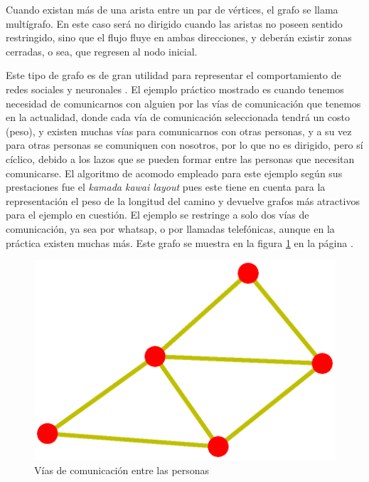 \documentclass{article}
\begin{document}
Cuando existan más de una arista entre un par de vértices, el grafo se llama multígrafo. En este caso será no dirigido cuando las aristas no poseen sentido restringido, sino que el flujo fluye en ambas direcciones, y deberán existir zonas cerradas, o sea, que regresen al nodo inicial.

Este tipo de grafo es de gran utilidad para representar el comportamiento de redes sociales y neuronales \cite{redes}. 
El ejemplo práctico mostrado es cuando tenemos necesidad de comunicarnos con alguien por las vías de comunicación que tenemos en la actualidad, donde cada vía de comunicación seleccionada tendrá un costo (peso), y existen muchas vías para comunicarnos con otras personas, y a su vez para otras personas se comuniquen con nosotros, por lo que no es dirigido, pero sí cíclico, debido a los lazos que se pueden formar entre las personas que necesitan comunicarse. El algoritmo de acomodo empleado para este ejemplo según sus prestaciones fue el \textit{kamada kawai layout} pues este tiene en cuenta para la representación el peso de la longitud del camino \cite{layout} y devuelve grafos más atractivos para el ejemplo en cuestión. El ejemplo se restringe a solo dos vías de comunicación, ya sea por whatsap, o por llamadas telefónicas, aunque en la práctica existen muchas más. Este grafo se muestra en la figura \ref{fig:Fig08} en la página \pageref{fig:Fig08}. 
\newpage


\begin{figure}[h]
    \centering
    \includegraphics[scale=0.6]{imagenes1/Fig08.eps}
    \caption{Vías de comunicación entre las personas}
    \label{fig:Fig08}
\end{figure}
\end{document}
